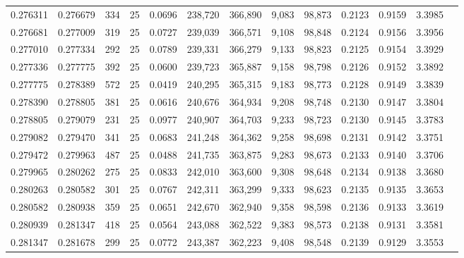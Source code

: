 \begin{tabular}{rrrrrrrrrrrrr}
0.276311 & 0.276679 &   334 &  25 &                                     0.0696 & 238,720 & 366,890 &   9,083 &  98,873 & 0.2123 & 0.9159 & 3.3985 \\
0.276681 & 0.277009 &   319 &  25 &                                     0.0727 & 239,039 & 366,571 &   9,108 &  98,848 & 0.2124 & 0.9156 & 3.3956 \\
0.277010 & 0.277334 &   292 &  25 &                                     0.0789 & 239,331 & 366,279 &   9,133 &  98,823 & 0.2125 & 0.9154 & 3.3929 \\
0.277336 & 0.277775 &   392 &  25 &                                     0.0600 & 239,723 & 365,887 &   9,158 &  98,798 & 0.2126 & 0.9152 & 3.3892 \\
0.277775 & 0.278389 &   572 &  25 &                                     0.0419 & 240,295 & 365,315 &   9,183 &  98,773 & 0.2128 & 0.9149 & 3.3839 \\
0.278390 & 0.278805 &   381 &  25 &                                     0.0616 & 240,676 & 364,934 &   9,208 &  98,748 & 0.2130 & 0.9147 & 3.3804 \\
0.278805 & 0.279079 &   231 &  25 &                                     0.0977 & 240,907 & 364,703 &   9,233 &  98,723 & 0.2130 & 0.9145 & 3.3783 \\
0.279082 & 0.279470 &   341 &  25 &                                     0.0683 & 241,248 & 364,362 &   9,258 &  98,698 & 0.2131 & 0.9142 & 3.3751 \\
0.279472 & 0.279963 &   487 &  25 &                                     0.0488 & 241,735 & 363,875 &   9,283 &  98,673 & 0.2133 & 0.9140 & 3.3706 \\
0.279965 & 0.280262 &   275 &  25 &                                     0.0833 & 242,010 & 363,600 &   9,308 &  98,648 & 0.2134 & 0.9138 & 3.3680 \\
0.280263 & 0.280582 &   301 &  25 &                                     0.0767 & 242,311 & 363,299 &   9,333 &  98,623 & 0.2135 & 0.9135 & 3.3653 \\
0.280582 & 0.280938 &   359 &  25 &                                     0.0651 & 242,670 & 362,940 &   9,358 &  98,598 & 0.2136 & 0.9133 & 3.3619 \\
0.280939 & 0.281347 &   418 &  25 &                                     0.0564 & 243,088 & 362,522 &   9,383 &  98,573 & 0.2138 & 0.9131 & 3.3581 \\
0.281347 & 0.281678 &   299 &  25 &                                     0.0772 & 243,387 & 362,223 &   9,408 &  98,548 & 0.2139 & 0.9129 & 3.3553 \\

\end{tabular}
